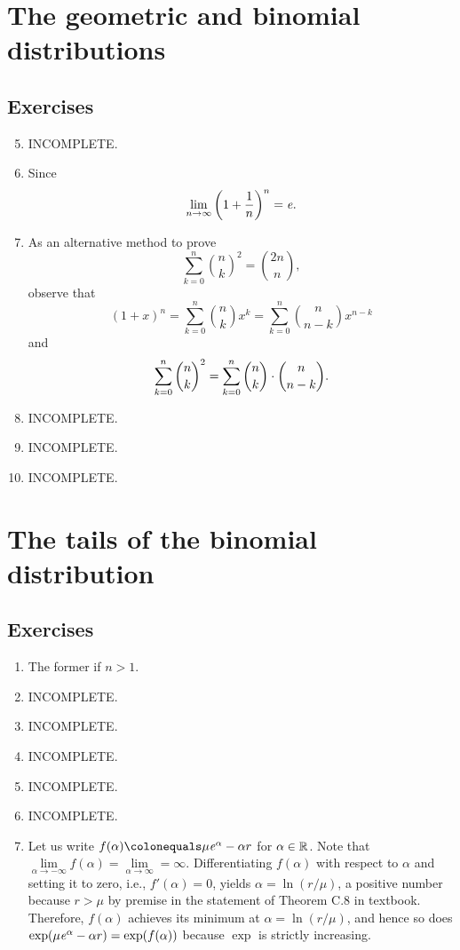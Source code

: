 \section{The geometric and binomial distributions}
\subsection*{Exercises}
\begin{enumerate}[\thesection-1]
%
\setcounter{enumi}{4}
%
\item INCOMPLETE.
%
\item Since
\[
\lim_{n \to \infty} \left(1 + \frac{1}{n}\right)^n = \mathit{e}.
\]
%
\item As an alternative method to prove
\[
\sum^n_{k = 0} {n \choose k}^2 = {2n \choose n},
\]
observe that
\[
(1 + x)^n = \sum^n_{k = 0} {n \choose k} x^k = \sum^n_{k = 0} {n \choose n - k} x^{n - k}
\]
and
\[
\sum^n_{k = 0} {n \choose k}^2 = \sum^n_{k = 0} {n \choose k} \cdot {n \choose n - k}.
\]
%
\item INCOMPLETE.
%
\item INCOMPLETE.
%
\item INCOMPLETE.
%
\end{enumerate}

\section{The tails of the binomial distribution}
\subsection*{Exercises}
\begin{enumerate}[\thesection-1]
%
\item The former if $n > 1$.
%
\item INCOMPLETE.
%
\item INCOMPLETE.
%
\item INCOMPLETE.
%
\item INCOMPLETE.
%
\item INCOMPLETE.
%
\item Let us write $f(\alpha) \defas \mu \e^\alpha - \alpha r$ for $\alpha \in \mathbb{R}$. Note that $\lim\limits_{\alpha \to -\infty} f(\alpha) = \lim\limits_{\alpha \to \infty} = \infty$. Differentiating $f(\alpha)$ with respect to $\alpha$ and setting it to zero, i.e., $f'(\alpha) = 0$, yields $\alpha = \ln(r/\mu)$, a positive number because $r > \mu$ by premise in the statement of Theorem C.8 in textbook. Therefore, $f(\alpha)$ achieves its minimum at $\alpha = \ln(r/\mu)$, and hence so does $\exp(\mu \mathit{e}^\alpha - \alpha r) = \exp(f(\alpha))$ because $\exp$ is strictly increasing.
%
\end{enumerate}

